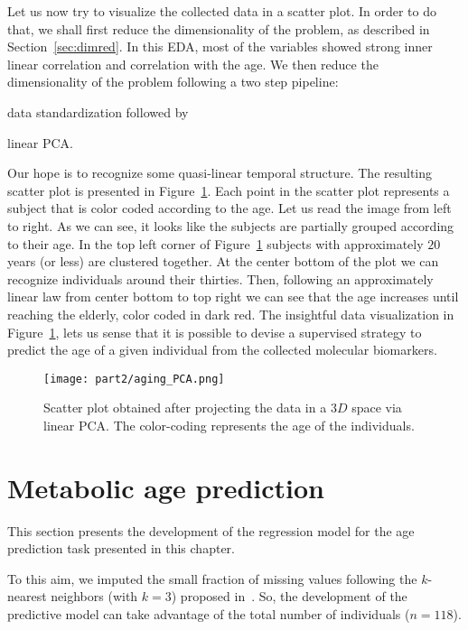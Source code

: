 Let us now try to visualize the collected data in a scatter plot. In order to do that, we shall first reduce the dimensionality of the problem, as described in Section~\ref{sec:dimred}.
In this EDA, most of the variables showed strong inner linear correlation and correlation with the age. We then reduce the dimensionality of the problem following a two step pipeline:
\begin{enumerate*}[label=(\roman*)]
	\item data standardization followed by
	\item linear PCA.
\end{enumerate*}
Our hope is to recognize some quasi-linear temporal structure. The resulting scatter plot is presented in Figure~\ref{fig:frassoni_PCA}.
Each point in the scatter plot represents a subject that is color coded according to the age.
Let us read the image from left to right.
As we can see, it looks like the subjects are partially grouped according to their age. In the top left corner of Figure~\ref{fig:frassoni_PCA} subjects with approximately $20$ years (or less) are clustered together. At the center bottom of the plot we can recognize individuals around their thirties. Then, following an approximately linear law from center bottom to top right we can see that the age increases until reaching the elderly, color coded in dark red.
The insightful data visualization in Figure~\ref{fig:frassoni_PCA}, lets us sense that it is possible to devise a supervised strategy to predict the age of a given individual from the collected molecular biomarkers.

\begin{figure}[]
	\centering
	\texttt{[image: part2/aging\_PCA.png]}
	\caption{Scatter plot obtained after projecting the data in a $3D$ space via linear PCA. The color-coding represents the age of the individuals.} \label{fig:frassoni_PCA}
\end{figure}


\section{Metabolic age prediction} \label{sec:frassoni_regression}
This section presents the development of the regression model for the age prediction task presented in this chapter.

To this aim, we imputed the small fraction of missing values following the $k$-nearest neighbors (with $k=3$) proposed in~\cite{troyanskaya2001missing}. So, the development of the predictive model can take advantage of the total number of individuals ($n=118$).

